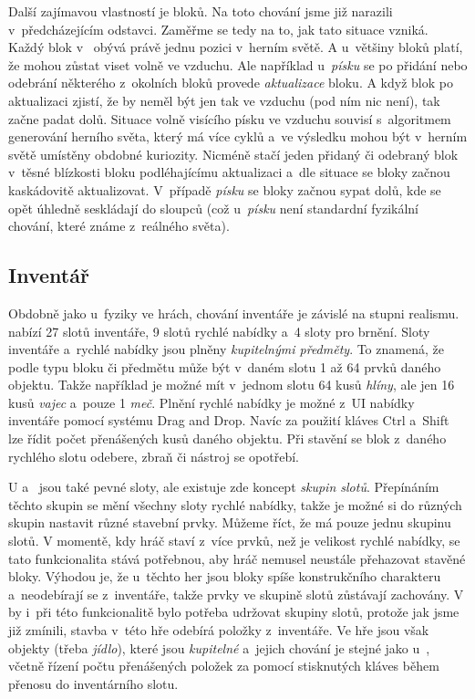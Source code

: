 Další zajímavou vlastností je  bloků. Na toto chování jsme již narazili v~předcházejícím odstavci. Zaměřme se tedy na to, jak tato situace vzniká. Každý blok v~ obývá právě jednu pozici v~herním světě. A u~většiny bloků platí, že mohou zůstat viset volně ve vzduchu. Ale například u~\textit{písku} se po přidání nebo odebrání některého z~okolních bloků provede \textit{aktualizace} bloku. A když blok po aktualizaci zjistí, že by neměl být jen tak ve vzduchu (pod ním nic není), tak začne padat dolů. Situace volně visícího písku ve vzduchu souvisí s~algoritmem generování herního světa, který má více cyklů a~ve výsledku mohou být v~herním světě umístěny obdobné kuriozity. Nicméně stačí jeden přidaný či odebraný blok v~těsné blízkosti bloku podléhajícímu aktualizaci a~dle situace se bloky začnou kaskádovitě aktualizovat. V~případě \textit{písku} se bloky začnou sypat dolů, kde se opět úhledně seskládají do sloupců (což u~\textit{písku} není standardní fyzikální chování, které známe z~reálného světa).


\subsection{Inventář}
\label{subsec:inventory}

Obdobně jako u~fyziky ve hrách, chování inventáře je závislé na stupni realismu. \MC{} nabízí 27 slotů inventáře, 9 slotů rychlé nabídky a~4 sloty pro brnění. Sloty inventáře a~rychlé nabídky jsou plněny \textit{kupitelnými předměty}. To znamená, že podle typu bloku či předmětu může být v~daném slotu 1 až 64 prvků daného objektu. Takže například je možné mít v~jednom slotu 64 kusů \textit{hlíny}, ale jen 16 kusů \textit{vajec} a~pouze 1 \textit{meč}. Plnění rychlé nabídky je možné z~UI nabídky inventáře pomocí systému Drag and Drop. Navíc za použití kláves Ctrl a~Shift lze řídit počet přenášených kusů daného objektu. Při stavění se blok z~daného rychlého slotu odebere, zbraň či nástroj se opotřebí.

U \ME{} a~\SE{} jsou také pevné sloty, ale existuje zde koncept \textit{skupin slotů}. Přepínáním těchto skupin se mění všechny sloty rychlé nabídky, takže je možné si do různých skupin nastavit různé stavební prvky. Můžeme říct, že \MC{} má pouze jednu skupinu slotů. V momentě, kdy hráč staví z~více prvků, než je velikost rychlé nabídky, se tato funkcionalita stává potřebnou, aby hráč nemusel neustále přehazovat stavěné bloky. Výhodou je, že u~těchto her jsou bloky spíše konstrukčního charakteru a~neodebírají se z~inventáře, takže prvky ve skupině slotů zůstávají zachovány. V  by i~při této funkcionalitě bylo potřeba udržovat skupiny slotů, protože jak jsme již zmínili, stavba v~této hře odebírá položky z~inventáře. Ve hře jsou však objekty (třeba \textit{jídlo}), které jsou \textit{kupitelné} a~jejich chování je stejné jako u~, včetně řízení počtu přenášených položek za pomocí stisknutých kláves během přenosu do inventárního slotu.

